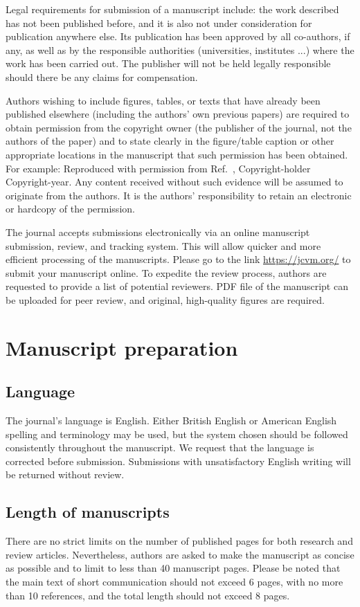 \documentclass{CVM}
\begin{document}
Legal requirements for submission of a manuscript include: the work
described has not been published before, and it is also not under
consideration for publication anywhere else. Its publication has been
approved by all co-authors, if any, as well as by the responsible
authorities (universities, institutes ...) where the work has
been carried out. The publisher will not be held legally responsible should
there be any claims for compensation.

Authors wishing to include figures, tables, or texts that have already been
published elsewhere (including the authors' own previous papers) are
required to obtain permission from the copyright owner (the publisher of the
journal, not the authors of the paper) and to state clearly in the
figure/table caption or other appropriate locations in the manuscript that
such permission has been obtained. For example: Reproduced with permission
from Ref.~\cite{1}, \textcopyright{} Copyright-holder Copyright-year. Any content
received without such evidence will be assumed to originate from the
authors. It is the authors' responsibility to retain an electronic or
hardcopy of the permission.

The journal accepts submissions electronically via an online manuscript
submission, review, and tracking system.
This will allow quicker and more efficient processing of the manuscripts.
Please go to the link \url{https://jcvm.org/} to
submit your manuscript online. To expedite the review process, authors are
requested to provide a list of potential reviewers. PDF file of the manuscript can be
uploaded for peer review, and original, high-quality figures are required.

\section{Manuscript preparation}

\subsection{Language}
The journal's language is English. Either British English or American
English spelling and terminology may be used, but the system chosen should
be followed consistently throughout the manuscript. We request that the
language is corrected before submission. Submissions with unsatisfactory
English writing will be returned without review.

\subsection{Length of manuscripts}
There are no strict limits on the number of published pages for both
research and review articles. Nevertheless, authors are asked to make the
manuscript as concise as possible and to limit to less than 40 manuscript
pages. Please be noted that the main text of short communication should not exceed 6 pages, with no more than 10 references, and the total length should not exceed 8 pages.
\end{document}

